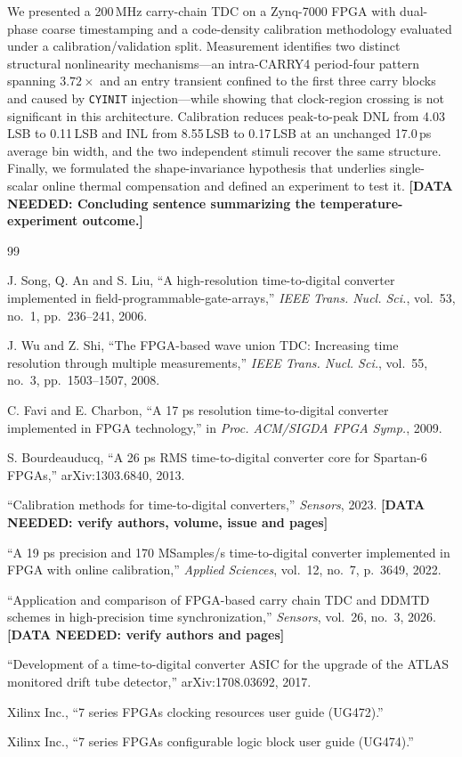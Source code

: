 \documentclass[journal]{IEEEtran}
\newcommand{\needdata}[1]{{\color{red}\textbf{[DATA NEEDED: #1]}}}
\begin{document}
We presented a 200\,MHz carry-chain TDC on a Zynq-7000 FPGA with dual-phase
coarse timestamping and a code-density calibration methodology evaluated under
a calibration/validation split. Measurement identifies two distinct structural
nonlinearity mechanisms---an intra-CARRY4 period-four pattern spanning
$3.72\times$ and an entry transient confined to the first three carry blocks
and caused by \texttt{CYINIT} injection---while showing that clock-region
crossing is not significant in this architecture. Calibration reduces
peak-to-peak DNL from 4.03\,LSB to 0.11\,LSB and INL from 8.55\,LSB to
0.17\,LSB at an unchanged 17.0\,ps average bin width, and the two independent
stimuli recover the same structure. Finally, we formulated the
shape-invariance hypothesis that underlies single-scalar online thermal
compensation and defined an experiment to test it.
\needdata{Concluding sentence summarizing the temperature-experiment outcome.}


\begin{thebibliography}{99}

J. Song, Q. An and S. Liu, ``A high-resolution time-to-digital converter
implemented in field-programmable-gate-arrays,'' \emph{IEEE Trans. Nucl. Sci.},
vol.~53, no.~1, pp.~236--241, 2006.

J. Wu and Z. Shi, ``The FPGA-based wave union TDC: Increasing time resolution
through multiple measurements,'' \emph{IEEE Trans. Nucl. Sci.}, vol.~55,
no.~3, pp.~1503--1507, 2008.

C. Favi and E. Charbon, ``A 17 ps resolution time-to-digital converter
implemented in FPGA technology,'' in \emph{Proc. ACM/SIGDA FPGA Symp.}, 2009.

S. Bourdeauducq, ``A 26 ps RMS time-to-digital converter core for Spartan-6
FPGAs,'' arXiv:1303.6840, 2013.

``Calibration methods for time-to-digital converters,'' \emph{Sensors}, 2023.
\needdata{verify authors, volume, issue and pages}

``A 19 ps precision and 170 MSamples/s time-to-digital converter implemented in
FPGA with online calibration,'' \emph{Applied Sciences}, vol.~12, no.~7,
p.~3649, 2022.

``Application and comparison of FPGA-based carry chain TDC and DDMTD schemes in
high-precision time synchronization,'' \emph{Sensors}, vol.~26, no.~3, 2026.
\needdata{verify authors and pages}

``Development of a time-to-digital converter ASIC for the upgrade of the ATLAS
monitored drift tube detector,'' arXiv:1708.03692, 2017.

Xilinx Inc., ``7 series FPGAs clocking resources user guide (UG472).''

Xilinx Inc., ``7 series FPGAs configurable logic block user guide (UG474).''

\end{thebibliography}
\end{document}

